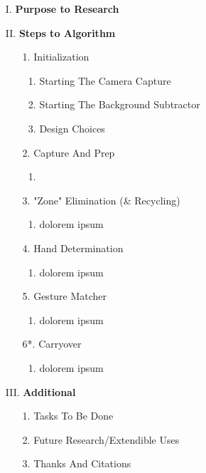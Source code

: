 \documentclass[letterpaper,11pt]{article}
\begin{document}
\begin{enumerate}
\item[I.] \textbf{Purpose to Research}

\item[II.] \textbf{Steps to Algorithm}

\begin{enumerate}
\item[1.] Initialization
\begin{enumerate}
\item Starting The Camera Capture
\item Starting The Background Subtractor
\item Design Choices 
\end{enumerate}

\item[2.] Capture And Prep
\begin{enumerate}
\item 
\end{enumerate}

\item[3.] "Zone" Elimination (\& Recycling)
\begin{enumerate}
\item dolorem ipsum
\end{enumerate}

\item[4.] Hand Determination
\begin{enumerate}
\item dolorem ipsum
\end{enumerate}

\item[5.] Gesture Matcher
\begin{enumerate}
\item dolorem ipsum
\end{enumerate}

\item[6*.] Carryover
\begin{enumerate}
\item dolorem ipsum
\end{enumerate}

\end{enumerate}

\item[III.] \textbf{Additional}

\begin{enumerate}
\item[1.] Tasks To Be Done
\item[2.] Future Research/Extendible Uses
\item[3.] Thanks And Citations
\end{enumerate}

\end{enumerate}
\end{document}
